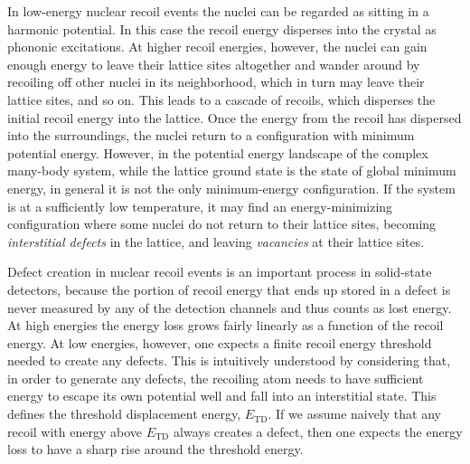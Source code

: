 In low-energy nuclear recoil events the nuclei can be regarded as sitting in a harmonic potential. In this case the recoil energy disperses into the crystal as phononic excitations. At higher recoil energies, however, the nuclei can gain enough energy to leave their lattice sites altogether and wander around by recoiling off other nuclei in its neighborhood, which in turn may leave their lattice sites, and so on. This leads to a cascade of recoils, which disperses the initial recoil energy into the lattice. Once the energy from the recoil has dispersed into the surroundings, the nuclei return to a configuration with minimum potential energy. However, in the potential energy landscape of the complex many-body system, while the lattice ground state is the state of global minimum energy, in general it is not the only minimum-energy configuration. If the system is at a sufficiently low temperature, it may find an energy-minimizing configuration where some nuclei do not return to their lattice sites, becoming \emph{interstitial defects} in the lattice, and leaving \emph{vacancies} at their lattice sites.

Defect creation in nuclear recoil events is an important process in solid-state detectors, because the portion of recoil energy that ends up stored in a defect is never measured by any of the detection channels and thus counts as lost energy. At high energies the energy loss grows fairly linearly as a function of the recoil energy. At low energies, however, one expects a finite recoil energy threshold needed to create any defects. This is intuitively understood by considering that, in order to generate any defects, the recoiling atom needs to have sufficient energy to escape its own potential well and fall into an interstitial state. This defines the threshold displacement energy, $E_\text{TD}$. If we assume naively that any recoil with energy above $E_\text{TD}$ always creates a defect, then one expects the energy loss to have a sharp rise around the threshold energy.

